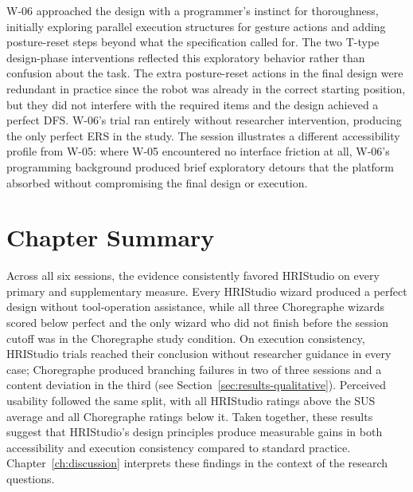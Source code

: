 W-06 approached the design with a programmer's instinct for thoroughness, initially exploring parallel execution structures for gesture actions and adding posture-reset steps beyond what the specification called for. The two T-type design-phase interventions reflected this exploratory behavior rather than confusion about the task. The extra posture-reset actions in the final design were redundant in practice since the robot was already in the correct starting position, but they did not interfere with the required items and the design achieved a perfect DFS. W-06's trial ran entirely without researcher intervention, producing the only perfect ERS in the study. The session illustrates a different accessibility profile from W-05: where W-05 encountered no interface friction at all, W-06's programming background produced brief exploratory detours that the platform absorbed without compromising the final design or execution.

\section{Chapter Summary}

Across all six sessions, the evidence consistently favored HRIStudio on every primary and supplementary measure. Every HRIStudio wizard produced a perfect design without tool-operation assistance, while all three Choregraphe wizards scored below perfect and the only wizard who did not finish before the session cutoff was in the Choregraphe study condition. On execution consistency, HRIStudio trials reached their conclusion without researcher guidance in every case; Choregraphe produced branching failures in two of three sessions and a content deviation in the third (see Section~\ref{sec:results-qualitative}). Perceived usability followed the same split, with all HRIStudio ratings above the SUS average and all Choregraphe ratings below it. Taken together, these results suggest that HRIStudio's design principles produce measurable gains in both accessibility and execution consistency compared to standard practice. Chapter~\ref{ch:discussion} interprets these findings in the context of the research questions.

